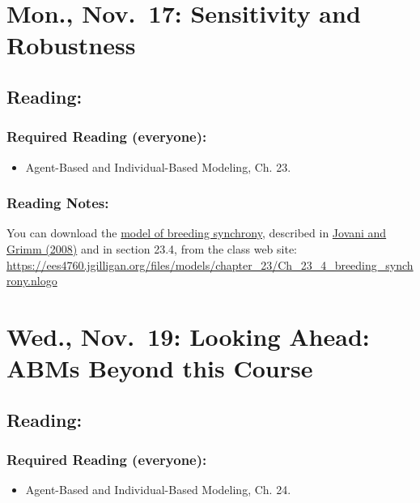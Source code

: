 \documentclass[
]{article}
\providecommand{\tightlist}{%
  \setlength{\itemsep}{0pt}\setlength{\parskip}{0pt}}
\begin{document}
\section{Mon., Nov.~17: Sensitivity and
Robustness}\label{mon.-nov.-17-sensitivity-and-robustness}

\subsection{Reading:}\label{reading-24}

\subsubsection{Required Reading
(everyone):}\label{required-reading-everyone-20}

\begin{itemize}
\tightlist
\item
  Agent-Based and Individual-Based Modeling, Ch. 23.
\end{itemize}

\subsubsection{Reading Notes:}\label{reading-notes-16}

You can download the
\href{/files/models/chapter_23/Ch_23_4_breeding_synchrony.nlogo}{model
of breeding synchrony}, described in
\href{/files/models/chapter_05/Jovani_Grimm_2008_Breeding.pdf}{Jovani
and Grimm (2008)} and in section 23.4, from the class web site:
\url{https://ees4760.jgilligan.org/files/models/chapter_23/Ch_23_4_breeding_synchrony.nlogo}

\section{Wed., Nov.~19: Looking Ahead: ABMs Beyond this
Course}\label{wed.-nov.-19-looking-ahead-abms-beyond-this-course}

\subsection{Reading:}\label{reading-25}

\subsubsection{Required Reading
(everyone):}\label{required-reading-everyone-21}

\begin{itemize}
\tightlist
\item
  Agent-Based and Individual-Based Modeling, Ch. 24.
\end{itemize}
\end{document}

